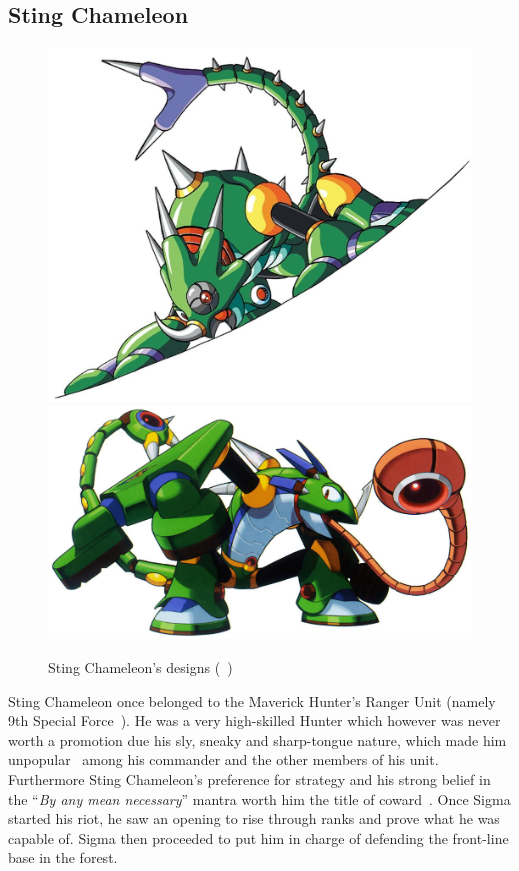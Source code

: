 \subsection{Sting Chameleon}\label{boss:Sting_chameleon}
\begin{figure}[htp]
	\centering
	\includegraphics[width=0.5\linewidth]{figures/X1/Sting_chameleon/Stingchameleon.jpg}
	\includegraphics[width=0.45\linewidth]{figures/X1/Sting_chameleon/MHXStingChameleon.jpg}
	\caption{Sting Chameleon's designs (~\cite{book:MMX_Complete_art})}
\end{figure}
Sting Chameleon once belonged to the Maverick Hunter's Ranger Unit (namely 9th Special Force~\cite{wayback:X_resources}). He was a very high-skilled Hunter which however was never worth a promotion due his sly, sneaky and sharp-tongue nature, which made him unpopular~\cite{Xcoll1:Manual_X1} among his commander and the other members of his unit. Furthermore Sting Chameleon's preference for strategy and his strong belief in the ``\textit{By any mean necessary}'' mantra  worth him the title of coward~\cite{MHX:manual}. Once Sigma started his riot, he saw an opening to rise through ranks and prove what he was capable of. Sigma then proceeded to put him in charge of defending the front-line base in the forest.

